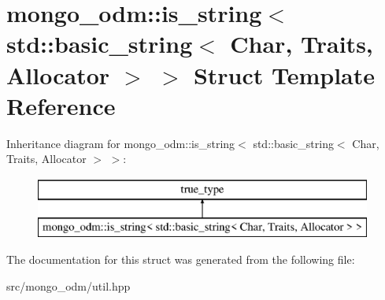 \hypertarget{structmongo__odm_1_1is__string_3_01std_1_1basic__string_3_01Char_00_01Traits_00_01Allocator_01_4_01_4}{}\section{mongo\+\_\+odm\+:\+:is\+\_\+string$<$ std\+:\+:basic\+\_\+string$<$ Char, Traits, Allocator $>$ $>$ Struct Template Reference}
\label{structmongo__odm_1_1is__string_3_01std_1_1basic__string_3_01Char_00_01Traits_00_01Allocator_01_4_01_4}
Inheritance diagram for mongo\+\_\+odm\+:\+:is\+\_\+string$<$ std\+:\+:basic\+\_\+string$<$ Char, Traits, Allocator $>$ $>$\+:\begin{figure}[H]
\begin{center}
\leavevmode
\includegraphics[height=2.000000cm]{structmongo__odm_1_1is__string_3_01std_1_1basic__string_3_01Char_00_01Traits_00_01Allocator_01_4_01_4}
\end{center}
\end{figure}


The documentation for this struct was generated from the following file\+:\begin{DoxyCompactItemize}
\item 
src/mongo\+\_\+odm/util.\+hpp\end{DoxyCompactItemize}
